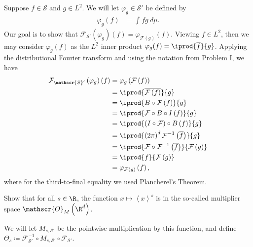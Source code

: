 \documentclass[10pt]{mypackage}
\renewcommand{\coloneq}{\coloneqq}
\begin{document}
\begin{solution}
  Suppose $f\in \mathscr{S}$ and $g\in L^2$. We will let $\varphi_{g}\in \mathscr{S}'$ be defined by
  \begin{align*}
    \varphi_{g}\left( f \right) &= \int_{}^{} fg\:d\mu.
  \end{align*}
  Our goal is to show that $ \mathcal{F}_{\mathscr{S}'}\left( \varphi_g \right)(f) = \varphi_{\mathcal{F}(g)}(f) $. Viewing $f\in L^2$, then we may consider $\varphi_g(f)$ as the $L^2$ inner product $ \varphi_{g}(f) = \iprod{ \overline{f} }{g}$. Applying the distributional Fourier transform and using the notation from Problem I, we have
  \begin{align*}
    \mathcal{F}_{\mathscr{S}'}\left( \varphi_g \right)\left( f \right) &= \varphi_g\left( \mathcal{F}\left( f \right) \right)\\
                                                                       &= \iprod{ \overline{\mathcal{F}\left( f \right)} }{ g }\\
                                                                       &= \iprod{ B\circ \mathcal{F}\left( f \right) }{ g }\\
                                                                       &= \iprod{ \mathcal{F}\circ B \circ I\left( f \right) }{g}\\
                                                                       &= \iprod{\left( I\circ \mathcal{F} \right)\circ B\left( f \right)}{g}\\
                                                                       &= \iprod{\left( 2\pi \right)^{d}\mathcal{F}^{-1}\left( \overline{f} \right)}{g}\\
                                                                       &= \iprod{\mathcal{F}\circ \mathcal{F}^{-1}\left( \overline{f} \right)}{ \mathcal{F}\left( g \right) }\\
                                                                       &= \iprod{f}{ \mathcal{F}\left( g \right) }\\
                                                                       &= \varphi_{\mathcal{F}\left( g \right)}\left( f \right),
  \end{align*}
  where for the third-to-final equality we used Plancherel's Theorem.
\end{solution}
\begin{problem}
  Show that for all $s\in \R$, the function $x\mapsto \left\langle x \right\rangle^{s}$ is in the so-called multiplier space $ \mathscr{O}_{M}\left( \R^d \right) $.

  We will let $M_{s,\mathscr{S}'}$ be the pointwise multiplication by this function, and define $\Theta_s\coloneq \mathcal{F}_{\mathscr{S}'}^{-1}\circ M_{s,\mathscr{S}'}\circ \mathcal{F}_{\mathscr{S}'}$.
\end{problem}
\end{document}
